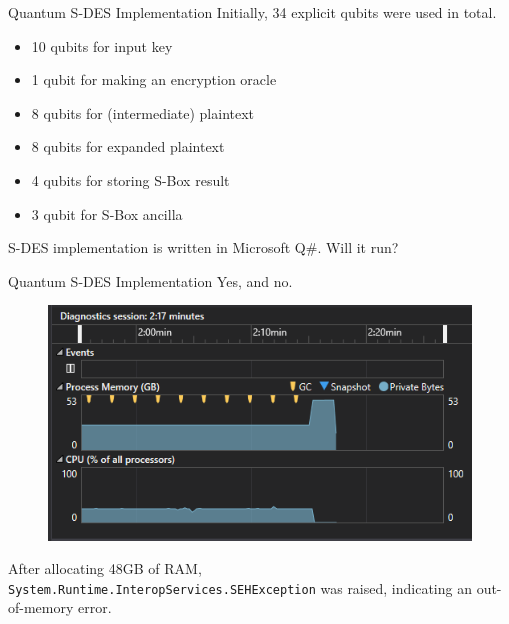 \documentclass{beamer}
\begin{document}
   	\begin{frame}{Quantum S-DES Implementation}
        Initially, 34 explicit qubits were used in total.
   		\begin{itemize}
            \item 10 qubits for input key
            \item 1 qubit for making an encryption oracle
            \item 8 qubits for (intermediate) plaintext
            \item 8 qubits for expanded plaintext
            \item 4 qubits for storing S-Box result
            \item 3 qubit for S-Box ancilla
   		\end{itemize}
        S-DES implementation is written in Microsoft Q\#. Will it run?
   	\end{frame}
       
   	\begin{frame}{Quantum S-DES Implementation}
        Yes, and no.
   		\begin{figure}[h]
            \centering
            \includegraphics[height=0.5\textheight]{./Images/Qsharp-SDES-memory-error-2.png}
        \end{figure}
        After allocating 48GB of RAM, \texttt{System.Runtime.InteropServices.SEHException} was raised, indicating an out-of-memory error.
   	\end{frame}
       
\end{document}
